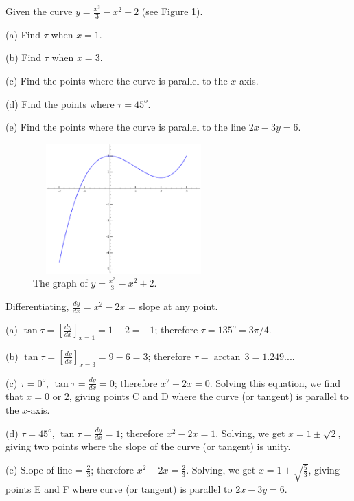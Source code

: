 \begin{example}
\label{ex:64}
{\rm
Given the curve $y = \frac{x^3}{3} - x^2 + 2$ (see 
Figure \ref{fig:tangent-example2}).

(a) Find $\tau$ when $x = 1$.

(b) Find $\tau$ when $x = 3$.

(c) Find the points where the curve is parallel to %
the $x$-axis. %

(d) Find the points where $\tau = 45^o$.

(e) Find the points where the curve is parallel to the 
line $2x - 3y = 6$. %

\begin{figure}[h!]
\begin{minipage}{\textwidth}
\begin{center}
\includegraphics[height=5cm,width=7cm]{tangent-examples2.eps}
\end{center}
\end{minipage}
\caption{The graph of $y = \frac{x^3}{3} - x^2 + 2$.}
\label{fig:tangent-example2}
\end{figure}

Differentiating, $\frac{dy}{dx} = x^2 - 2x$ = slope at any point.

(a) $\tan \tau = \left [ \frac{dy}{dx} \right ]_{x=1} = 1 - 2 = -1$; 
therefore $\tau = 135^o
=3\pi/4$. %

(b) $\tan \tau = \left [ \frac{dy}{dx} \right ]_{x=3} = 9 - 6 = 3$; 
therefore $\tau = \arctan\, 3 = 1.249...$. 

(c) $\tau = 0^o$, $\tan \tau = \frac{dy}{dx} = 0$; 
therefore $x^2 - 2x = 0$. Solving this equation, 
we find that $x = 0$ or $2$, giving points C and D where the 
curve (or tangent) is parallel to %
the $x$-axis.

(d) $\tau = 45^o$, $\tan \tau = \frac{dy}{dx} = 1$; 
therefore $x^2 - 2x = 1$. Solving, we get 
$x = 1 \pm \sqrt{2}$, giving two points where the slope of 
the curve (or tangent) is unity.

(e) Slope of line = $\frac{2}{3}$; therefore $x^2 - 2x = \frac{2}{3}$. 
Solving, we get $x = 1 \pm \sqrt{\frac{5}{3}}$, giving points E 
and F where curve (or tangent) is parallel to %
$2x - 3y = 6$.
}
\end{example}

